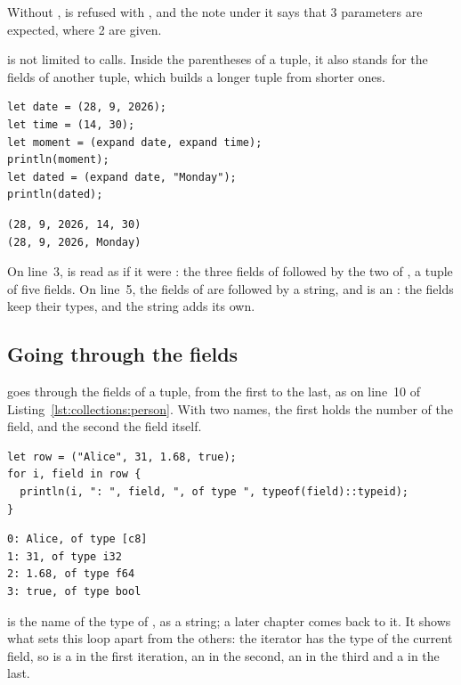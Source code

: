 Without ,  is refused with
, and the note under it says that 3 parameters are expected, where
2 are given.

 is not limited to calls. Inside the parentheses of a tuple, it
also stands for the fields of another tuple, which builds a longer tuple from
shorter ones.

\begin{lstlisting}[style=coloredverbatim]
let date = (28, 9, 2026);
let time = (14, 30);
let moment = (expand date, expand time);
println(moment);
let dated = (expand date, "Monday");
println(dated);
\end{lstlisting}
\vspace{-10pt}%
\begin{lstlisting}[style=bashVerb]
(28, 9, 2026, 14, 30)
(28, 9, 2026, Monday)
\end{lstlisting}

On line~3,  is read as if it were
: the three fields of  followed by the
two of , a tuple of five fields. On line~5, the fields of
 are followed by a string, and  is an
: the fields keep their types, and the string adds
its own.

\subsection{Going through the fields}

 goes through the fields of a tuple, from the first to the last, as
on line~10 of Listing~\ref{lst:collections:person}. With two names, the first
holds the number of the field, and the second the field itself.

\begin{lstlisting}[style=coloredverbatim]
let row = ("Alice", 31, 1.68, true);
for i, field in row {
  println(i, ": ", field, ", of type ", typeof(field)::typeid);
}
\end{lstlisting}
\vspace{-10pt}%
\begin{lstlisting}[style=bashVerb]
0: Alice, of type [c8]
1: 31, of type i32
2: 1.68, of type f64
3: true, of type bool
\end{lstlisting}

 is the name of the type of , as a
string; a later chapter comes back to it. It shows what sets this loop apart
from the others: the iterator has the type of the current field, so
 is a \token{[c8]} in the first iteration, an  in the
second, an  in the third and a  in the last.

